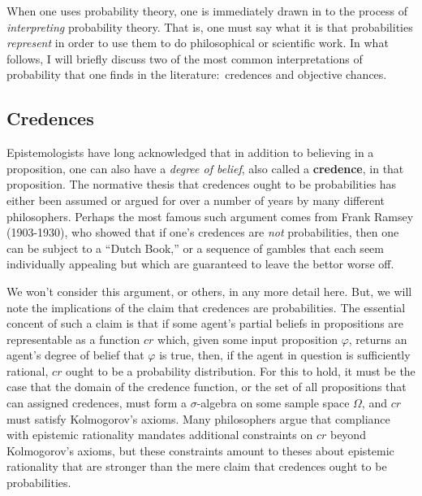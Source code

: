 \documentclass[11pt]{article}
\theoremstyle{definition}
\theoremstyle{remark}
\begin{document}
When one uses probability theory, one is immediately drawn in to the process of \textit{interpreting} probability theory. That is, one must say what it is that probabilities \textit{represent} in order to use them to do philosophical or scientific work. In what follows, I will briefly discuss two of the most common interpretations of probability that one finds in the literature:\ credences and objective chances.\par 


\subsection{Credences}
Epistemologists have long acknowledged that in addition to believing in a proposition, one can also have a \textit{degree of belief}, also called a \textbf{credence}, in that proposition. The normative thesis that credences ought to be probabilities has either been assumed or argued for over a number of years by many different philosophers. Perhaps the most famous such argument comes from Frank Ramsey (1903-1930), who showed that if one's credences are \textit{not} probabilities, then one can be subject to a ``Dutch Book,'' or a sequence of gambles that each seem individually appealing but which are guaranteed to leave the bettor worse off.\par

We won't consider this argument, or others, in any more detail here. But, we will note the implications of the claim that credences are probabilities. The essential concent of such a claim is that if some agent's partial beliefs in propositions are representable as a function $cr$ which, given some input proposition $\varphi$, returns an agent's degree of belief that $\varphi$ is true, then, if the agent in question is sufficiently rational, $cr$ ought to be a probability distribution. For this to hold, it must be the case that the domain of the credence function, or the set of all propositions that can assigned credences, must form a $\sigma$-algebra on some sample space $\Omega$, and $cr$ must satisfy Kolmogorov's axioms. Many philosophers argue that compliance with epistemic rationality mandates additional constraints on $cr$ beyond Kolmogorov's axioms, but these constraints amount to theses about epistemic rationality that are stronger than the mere claim that credences ought to be probabilities.\par 
\end{document}
